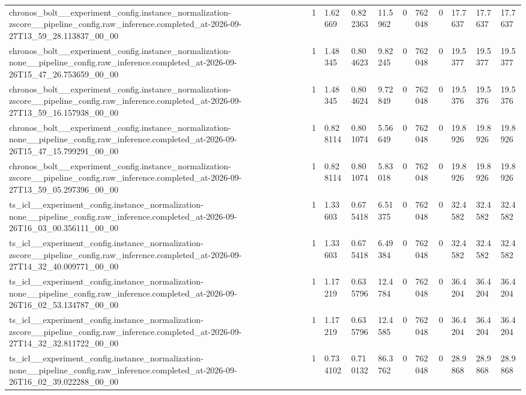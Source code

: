 \begin{tabular}{lllllllllll}
chronos\_bolt\_\_experiment\_config.instance\_normalization-zscore\_\_pipeline\_config.raw\_inference.completed\_at-2026-09-27T13\_59\_28.113837\_00\_00 & 1 & 1.62669 & 0.822363 & 11.5962 & 0 & 762048 & 0 & 17.7637 & 17.7637 & 17.7637 \\
chronos\_bolt\_\_experiment\_config.instance\_normalization-none\_\_pipeline\_config.raw\_inference.completed\_at-2026-09-26T15\_47\_26.753659\_00\_00 & 1 & 1.48345 & 0.804623 & 9.82245 & 0 & 762048 & 0 & 19.5377 & 19.5377 & 19.5377 \\
chronos\_bolt\_\_experiment\_config.instance\_normalization-zscore\_\_pipeline\_config.raw\_inference.completed\_at-2026-09-27T13\_59\_16.157938\_00\_00 & 1 & 1.48345 & 0.804624 & 9.72849 & 0 & 762048 & 0 & 19.5376 & 19.5376 & 19.5376 \\
chronos\_bolt\_\_experiment\_config.instance\_normalization-none\_\_pipeline\_config.raw\_inference.completed\_at-2026-09-26T15\_47\_15.799291\_00\_00 & 1 & 0.828114 & 0.801074 & 5.56649 & 0 & 762048 & 0 & 19.8926 & 19.8926 & 19.8926 \\
chronos\_bolt\_\_experiment\_config.instance\_normalization-zscore\_\_pipeline\_config.raw\_inference.completed\_at-2026-09-27T13\_59\_05.297396\_00\_00 & 1 & 0.828114 & 0.801074 & 5.83018 & 0 & 762048 & 0 & 19.8926 & 19.8926 & 19.8926 \\
ts\_icl\_\_experiment\_config.instance\_normalization-none\_\_pipeline\_config.raw\_inference.completed\_at-2026-09-26T16\_03\_00.356111\_00\_00 & 1 & 1.33603 & 0.675418 & 6.51375 & 0 & 762048 & 0 & 32.4582 & 32.4582 & 32.4582 \\
ts\_icl\_\_experiment\_config.instance\_normalization-zscore\_\_pipeline\_config.raw\_inference.completed\_at-2026-09-27T14\_32\_40.009771\_00\_00 & 1 & 1.33603 & 0.675418 & 6.49384 & 0 & 762048 & 0 & 32.4582 & 32.4582 & 32.4582 \\
ts\_icl\_\_experiment\_config.instance\_normalization-none\_\_pipeline\_config.raw\_inference.completed\_at-2026-09-26T16\_02\_53.134787\_00\_00 & 1 & 1.17219 & 0.635796 & 12.4784 & 0 & 762048 & 0 & 36.4204 & 36.4204 & 36.4204 \\
ts\_icl\_\_experiment\_config.instance\_normalization-zscore\_\_pipeline\_config.raw\_inference.completed\_at-2026-09-27T14\_32\_32.811722\_00\_00 & 1 & 1.17219 & 0.635796 & 12.4585 & 0 & 762048 & 0 & 36.4204 & 36.4204 & 36.4204 \\
ts\_icl\_\_experiment\_config.instance\_normalization-none\_\_pipeline\_config.raw\_inference.completed\_at-2026-09-26T16\_02\_39.022288\_00\_00 & 1 & 0.734102 & 0.710132 & 86.3762 & 0 & 762048 & 0 & 28.9868 & 28.9868 & 28.9868 \\

\end{tabular}

